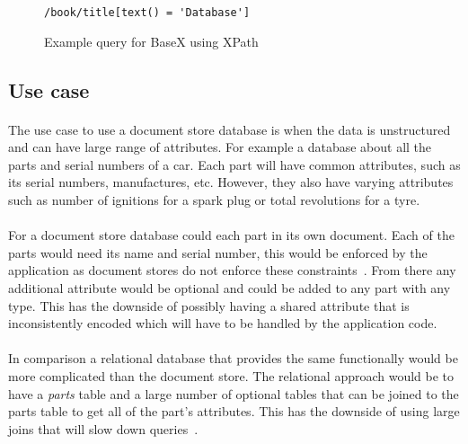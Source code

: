 \documentclass{CRPITStyle}
\renewcommand{\cite}{\citep}
\begin{document}
\begin{figure}
\begin{verbatim}
/book/title[text() = 'Database']
\end{verbatim}
\caption{Example query for BaseX using XPath}
\label{lst:basex}
\end{figure}

\subsection{Use case}

\paragraph{}
The use case to use a document store database is when
the data is unstructured and can have large range of attributes.
For example a database about all the parts and serial numbers
of a car.
Each part will have common attributes, such as its serial numbers,
manufactures, etc. 
However, they also have varying attributes such
as number of ignitions for a spark plug or total revolutions for
a tyre.

\paragraph{}
For a document store database could each part in its own document.
Each of the parts would need its name and serial number, this would
be enforced by the application as document stores do not enforce these
constraints~\cite{nosql_db,basex,nosql_survey}.
From there any additional attribute would be optional and could
be added to any part with any type.
This has the downside of possibly having a shared attribute that
is inconsistently encoded which will have to be handled by the application
code.

\paragraph{}
In comparison a relational database that provides the same functionally
would be more complicated than the document store.
The relational approach would be to have a \textit{parts} table
and a large number of optional tables that can be joined to the parts
table to get all of the part's attributes.
This has the downside of using large joins that will slow down
queries~\cite{scalable_sql}.
\end{document}
